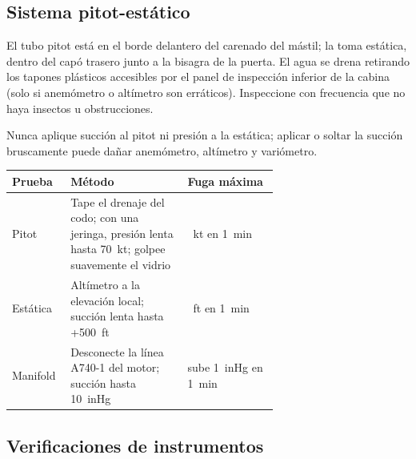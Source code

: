\subsection{Sistema pitot-estático}

El tubo pitot está en el borde delantero del carenado del mástil; la toma estática, dentro del capó trasero junto a la bisagra de la puerta. El agua se drena retirando los tapones plásticos accesibles por el panel de inspección inferior de la cabina (solo si anemómetro o altímetro son erráticos). Inspeccione con frecuencia que no haya insectos u obstrucciones.

\begin{precaucion}
Nunca aplique succión al pitot ni presión a la estática; aplicar o soltar la succión bruscamente puede dañar anemómetro, altímetro y variómetro.
\end{precaucion}

\begin{center}
\small
\begin{tabularx}{\linewidth}{@{}>{\raggedright\arraybackslash}p{0.22\linewidth}>{\raggedright\arraybackslash}p{0.44\linewidth}>{\raggedright\arraybackslash}X@{}}
\toprule
Prueba & Método & Fuga máxima \\
\midrule
Pitot & Tape el drenaje del codo; con una jeringa, presión lenta hasta 70~kt; golpee suavemente el vidrio & 10~kt en 1~min \\
Estática & Altímetro a la elevación local; succión lenta hasta +500~ft & 100~ft en 1~min \\
Manifold & Desconecte la línea A740-1 del motor; succión hasta 10~inHg & sube 1~inHg en 1~min \\
\bottomrule
\end{tabularx}
\end{center}

\subsection{Verificaciones de instrumentos}

